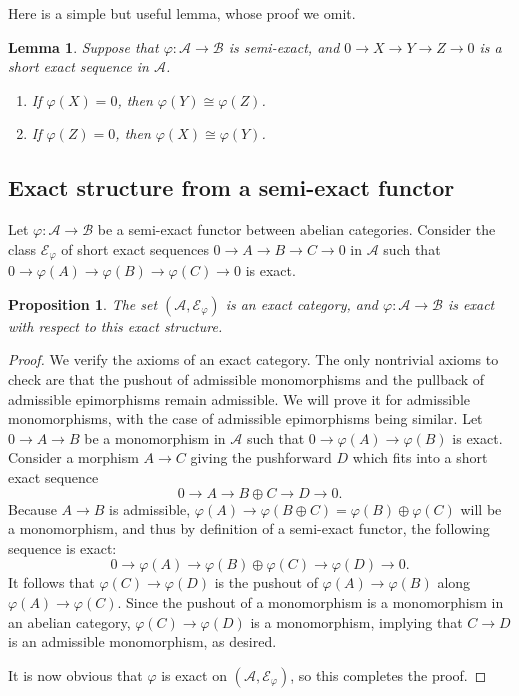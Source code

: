 \documentclass[11pt]{amsart}
\def\EE{\mathcal{E}}
\def\As{\mathscr{A}}
\def\Bs{\mathscr{B}}
\newtheorem{lemma}[thm]{Lemma}
\newtheorem{prop}[thm]{Proposition}
\theoremstyle{definition}
\theoremstyle{remark}
\numberwithin{equation}{section}
\begin{document}
Here is a simple but useful lemma, whose proof we omit.

\begin{lemma}\label{lemma easy}
    Suppose that $\varphi:\As\to\Bs$ is semi-exact, and $0\to X\to Y\to Z\to 0$ is a short exact sequence in $\As$.  
    \begin{enumerate}
        \item If $\varphi(X)=0$, then $\varphi(Y)\cong \varphi(Z)$.  
        \item If $\varphi(Z)=0$, then $\varphi(X)\cong\varphi(Y)$.
    \end{enumerate}
\end{lemma}


\subsection{Exact structure from a semi-exact functor}Let $\varphi:\As\to\Bs$ be a semi-exact functor     between abelian categories.  Consider the class $\EE_{\varphi}$ of short exact sequences $0\to A\to B\to C\to 0$ in $\As$ such that $0\to\varphi(A)\to\varphi(B)\to\varphi(C)\to0$ is exact.  
\begin{prop}
  The set $(\As,\EE_{\varphi})$ is an exact category, and $\varphi:\As\to\Bs$ is exact with respect to this exact structure.
\end{prop}

\begin{proof}
    We verify the axioms of an exact category.  The only nontrivial axioms to check are that the pushout of admissible monomorphisms and the pullback of admissible epimorphisms remain admissible.  We will prove it for admissible monomorphisms, with the case of admissible epimorphisms being similar.  Let $0\to A\to B$ be a monomorphism in $\As$ such that $0\to\varphi(A)\to\varphi(B)$ is exact.  Consider a morphism $A\to C$ giving the pushforward $D$ which fits into a short exact sequence
    \[
    0\to A\to B\oplus C\to D\to 0.
    \]  
    Because $A\to B$ is admissible, $\varphi(A)\to\varphi(B\oplus C)=\varphi(B)\oplus\varphi(C)$ will be a monomorphism, and thus by definition of a semi-exact functor, the following sequence is exact:
    \[
    0\to \varphi(A)\to\varphi(B)\oplus\varphi(C)\to\varphi(D)\to 0.
    \]
    It follows that $\varphi(C)\to \varphi(D)$ is the pushout of $\varphi(A)\to\varphi(B)$ along $\varphi(A)\to\varphi(C)$.  Since the pushout of a monomorphism is a monomorphism in an abelian category, $\varphi(C)\to\varphi(D)$ is a monomorphism, implying that $C\to D$ is an admissible monomorphism, as desired.

    It is now obvious that $\varphi$ is exact on $(\As,\EE_{\varphi})$, so this completes the proof.
\end{proof}
\end{document}
